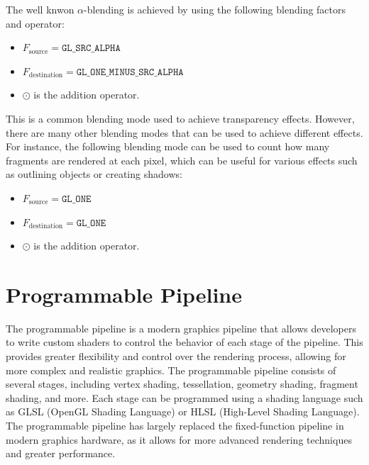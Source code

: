 The well knwon $\alpha$-blending is achieved by using the following blending factors and operator:
\begin{itemize}
    \item $F_{\text{source}} = \texttt{GL\_SRC\_ALPHA}$
    \item $F_{\text{destination}} = \texttt{GL\_ONE\_MINUS\_SRC\_ALPHA}$
    \item $\odot$ is the addition operator.
\end{itemize}
This is a common blending mode used to achieve transparency effects. However, there are many other blending modes that can be used to achieve different effects. For instance, the following blending mode can be used to count how many fragments are rendered at each pixel, which can be useful for various effects such as outlining objects or creating shadows:
\begin{itemize}
    \item $F_{\text{source}} = \texttt{GL\_ONE}$
    \item $F_{\text{destination}} = \texttt{GL\_ONE}$
    \item $\odot$ is the addition operator.
\end{itemize}

\section{Programmable Pipeline}

The programmable pipeline is a modern graphics pipeline that allows developers to write custom shaders to control the behavior of each stage of the pipeline. This provides greater flexibility and control over the rendering process, allowing for more complex and realistic graphics. The programmable pipeline consists of several stages, including vertex shading, tessellation, geometry shading, fragment shading, and more. Each stage can be programmed using a shading language such as GLSL (OpenGL Shading Language) or HLSL (High-Level Shading Language). The programmable pipeline has largely replaced the fixed-function pipeline in modern graphics hardware, as it allows for more advanced rendering techniques and greater performance.